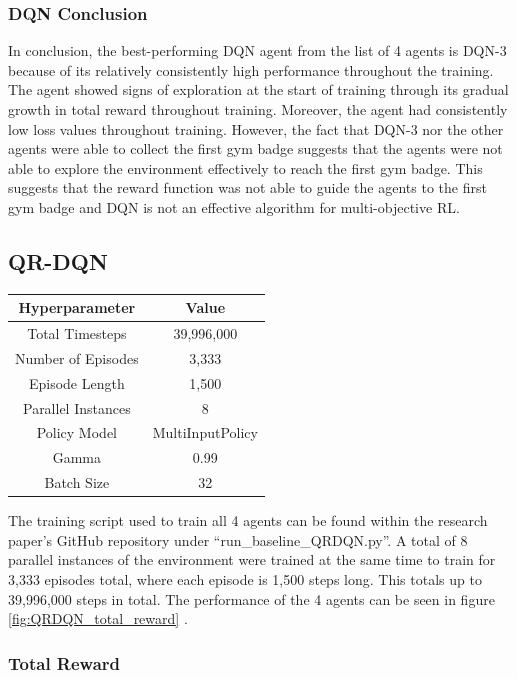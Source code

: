 \subsubsection{DQN Conclusion}

In conclusion, the best-performing DQN agent from the list of 4 agents is DQN-3 because of its relatively consistently high performance throughout the training. The agent showed signs of exploration at the start of training through its gradual growth in total reward throughout training. Moreover, the agent had consistently low loss values throughout training. However, the fact that DQN-3 nor the other agents were able to collect the first gym badge suggests that the agents were not able to explore the environment effectively to reach the first gym badge. This suggests that the reward function was not able to guide the agents to the first gym badge and DQN is not an effective algorithm for multi-objective RL.

\subsection{QR-DQN}

\begin{center}
    \begin{tabular}{ |c|c| } 
     \hline
     Hyperparameter & Value \\ 
     \hline
     Total Timesteps & 39,996,000 \\
     Number of Episodes &  3,333 \\
     Episode Length & 1,500 \\ 
     Parallel Instances & 8 \\
     Policy Model & MultiInputPolicy \\
     Gamma & 0.99 \\  
     Batch Size & 32 \\
     \hline
    \end{tabular}
    \end{center}

The training script used to train all 4 agents can be found within the research paper's GitHub repository under ``run\_baseline\_QRDQN.py''. A total of 8 parallel instances of the environment were trained at the same time to train for 3,333 episodes total, where each episode is 1,500 steps long. This totals up to 39,996,000 steps in total. The performance of the 4 agents can be seen in figure \ref{fig:QRDQN_total_reward} . 

\subsubsection{Total Reward}

